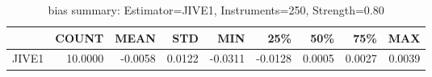 \begin{table}[ht]
\centering
\caption{bias summary: Estimator=JIVE1, Instruments=250, Strength=0.80}
\begin{tabular}{lrrrrrrrr}
\toprule
 & COUNT & MEAN & STD & MIN & 25\% & 50\% & 75\% & MAX \\
\midrule
JIVE1 & 10.0000 & -0.0058 & 0.0122 & -0.0311 & -0.0128 & 0.0005 & 0.0027 & 0.0039 \\
\bottomrule
\end{tabular}
\end{table}
